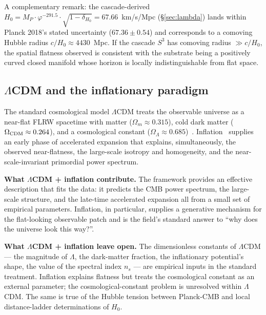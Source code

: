 \documentclass[11pt]{article}
\theoremstyle{plain}
\theoremstyle{definition}
\theoremstyle{remark}
\begin{document}
A complementary remark: the cascade-derived $H_0 = M_P \cdot \varphi^{-291.5} \cdot \sqrt{1-\delta_{H_0}} = 67.66$~km/s/Mpc (\S\ref{sec:lambda}) lands within Planck 2018's stated uncertainty ($67.36 \pm 0.54$) and corresponds to a comoving Hubble radius $c/H_0 \approx 4430$~Mpc. If the cascade $S^3$ has comoving radius $\gg c/H_0$, the spatial flatness observed is consistent with the substrate being a positively curved closed manifold whose horizon is locally indistinguishable from flat space.

\subsection{$\Lambda$CDM and the inflationary paradigm}\label{sec:bridge-lcdm}

The standard cosmological model $\Lambda$CDM treats the observable universe as a near-flat FLRW spacetime with matter ($\Omega_m \approx 0.315$), cold dark matter ($\Omega_{\rm CDM} \approx 0.264$), and a cosmological constant ($\Omega_\Lambda \approx 0.685$)~\citep{Planck2018}. Inflation~\citep{Guth1981, Linde1982} supplies an early phase of accelerated expansion that explains, simultaneously, the observed near-flatness, the large-scale isotropy and homogeneity, and the near-scale-invariant primordial power spectrum.

\medskip
\noindent\textbf{What $\Lambda$CDM + inflation contribute.} The framework provides an effective description that fits the data: it predicts the CMB power spectrum, the large-scale structure, and the late-time accelerated expansion all from a small set of empirical parameters. Inflation, in particular, supplies a generative mechanism for the flat-looking observable patch and is the field's standard answer to ``why does the universe look this way?''.

\medskip
\noindent\textbf{What $\Lambda$CDM + inflation leave open.} The dimensionless constants of $\Lambda$CDM --- the magnitude of $\Lambda$, the dark-matter fraction, the inflationary potential's shape, the value of the spectral index $n_s$ --- are empirical inputs in the standard treatment. Inflation explains flatness but treats the cosmological constant as an external parameter; the cosmological-constant problem is unresolved within $\Lambda$CDM. The same is true of the Hubble tension between Planck-CMB and local distance-ladder determinations of $H_0$.
\end{document}
